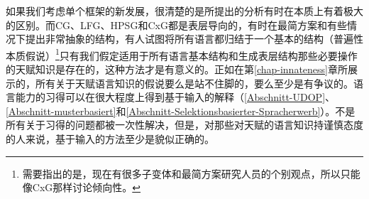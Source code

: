如果我们考虑单个框架的新发展，很清楚的是所提出的分析有时在本质上有着极大的区别。而CG、LFG、HPSG和CxG都是表层导向的，有时在最简方案和有些情况下提出非常抽象的结构，有人试图将所有语言都归结于一个基本的结构（普遍性本质假说）\footnote{
需要指出的是，现在有很多子变体和最简方案研究人员的个别观点，所以只能像CxG那样讨论倾向性。
}只有我们假定适用于所有语言基本结构和生成表层结构那些必要操作的天赋知识是存在的，这种方法才是有意义的。正如在第\ref{chap-innateness}章所展示的，所有关于天赋语言知识的假说要么是站不住脚的，要么至少是有争议的。语言能力的习得可以在很大程度上得到基于输入的解释（\ref{Abschnitt-UDOP}、\ref{Abschnitt-musterbasiert}和\ref{Abschnitt-Selektionsbasierter-Spracherwerb}）。不是所有关于习得的问题都被一次性解决，但是，对那些对天赋的语言知识持谨慎态度的人来说，基于输入的方法至少是貌似正确的。

